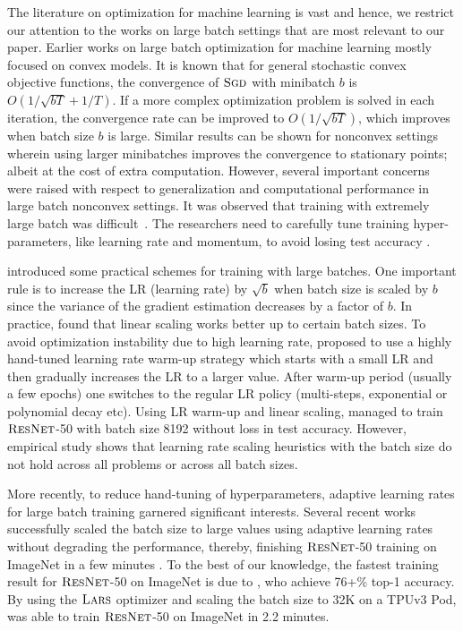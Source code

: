 \documentclass{article} \usepackage{iclr2020_conference,times}
\newcommand{\resnet}{\textsc{ResNet}}
\newcommand{\sgd}{\textsc{Sgd}\xspace}
\newcommand{\lars}{\textsc{Lars}}
\begin{document}
The literature on optimization for machine learning is vast and hence, we restrict our attention to the works on large batch settings that are most relevant to our paper. Earlier works on large batch optimization for machine learning mostly focused on convex models. It is known that for general stochastic convex objective functions, the convergence of $\sgd$ with minibatch $b$ is $O(1/\sqrt{bT} + 1/T)$.  If a more complex optimization problem is solved in each iteration, the convergence rate can be improved to $O(1/\sqrt{bT})$, which improves when batch size $b$ is large. Similar results can be shown for nonconvex settings wherein using larger minibatches improves the convergence to stationary points; albeit at the cost of extra computation. However, several important concerns were raised with respect to generalization and computational performance in large batch nonconvex settings. It was observed that training with extremely large batch was difficult~\citep{keskar2016large, hoffer2017train}. The researchers need to carefully tune training hyper-parameters, like learning rate and momentum, to avoid losing test accuracy \citep{goyal2017accurate, li2017scaling, you2018imagenet, shallue2018measuring}. 

\citet{krizhevsky2014one} introduced some practical schemes for training with large batches. One important rule is to increase the LR (learning rate) by $\sqrt{b}$ when batch size is scaled by $b$ since  the variance of the gradient estimation decreases by a factor of $b$. In practice, \citep{krizhevsky2014one} found that  linear scaling works better up to certain batch sizes. To avoid optimization instability due to high learning rate, \citet{goyal2017accurate} proposed to use a highly hand-tuned  learning rate warm-up strategy which starts with a small LR and then gradually increases the LR to a larger value. After warm-up period (usually a few epochs) one switches to the regular LR policy (multi-steps, exponential or polynomial decay etc). Using LR warm-up and linear scaling, \citet{goyal2017accurate} managed to train $\resnet$-50 with batch size 8192 without loss in test accuracy. However, empirical study \citep{shallue2018measuring} shows that learning rate scaling heuristics with the batch size do not hold across all problems or across all batch sizes.

More recently, to reduce hand-tuning of hyperparameters, adaptive learning rates for large batch training garnered significant interests. Several recent works successfully scaled the batch size to large values using adaptive learning rates without degrading the performance, thereby, finishing $\resnet$-50 training on ImageNet in a few minutes \citep{you2018imagenet,iandola2016firecaffe,codreanu2017scale,akiba2017extremely,jia2018highly,smith2017don,martens2015optimizing,devarakonda2017adabatch,mikami2018imagenet,osawa2018second,you2019large,yamazaki2019yet}.
To the best of our knowledge, the fastest training result for $\resnet$-50 on ImageNet is due to \cite{ying2018image}, who achieve 76+\% top-1 accuracy. By using the $\lars$ optimizer and scaling the batch size to 32K  on a TPUv3 Pod, \citet{ying2018image} was able to train $\resnet$-50 on ImageNet in 2.2 minutes. 
\end{document}
